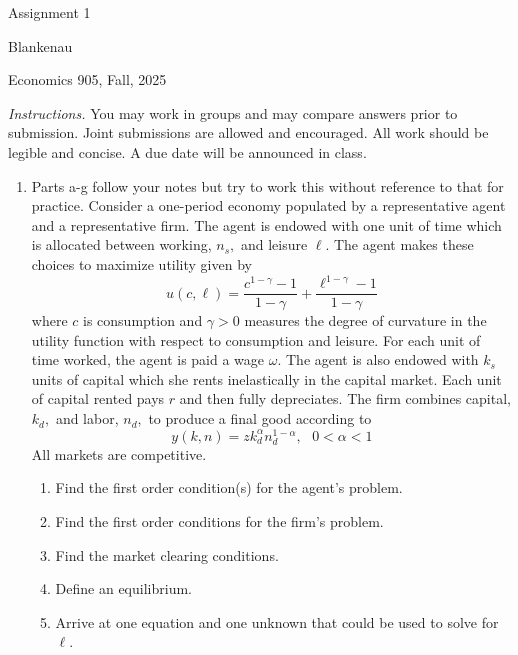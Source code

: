 \documentclass[12pt]{article}
\begin{document}
\begin{center}
{\LARGE Assignment 1}
\end{center}

\noindent Blankenau

\noindent Economics 905, Fall, 2025

\medskip
\noindent \textit{Instructions.} You may work in groups and may compare
answers prior to submission. Joint submissions are allowed and encouraged.
All work should be legible and concise. A due date will be announced in
class.

\begin{enumerate}
\item Parts a-g follow your notes but try to work this without reference to
that for practice. Consider a one-period economy populated by a
representative agent and a representative firm. The agent is endowed with
one unit of time which is allocated between working, $n_{s},$ and leisure $%
\ell $. The agent makes these choices to maximize utility given by 
\begin{equation*}
u\left( c,\ell \right) =\frac{c^{1-\gamma }-1}{1-\gamma }+\frac{\ell
^{1-\gamma }-1}{1-\gamma }
\end{equation*}%
where $c$ is consumption and $\gamma >0$ measures the degree of curvature in
the utility function with respect to consumption and leisure. For each unit
of time worked, the agent is paid a wage $\omega $. The agent is also
endowed with $k_{s}$ units of capital which she rents inelastically in the
capital market. Each unit of capital rented pays $r$ and then fully
depreciates. The firm combines capital, $k_{d},$ and labor, $n_{d},$ to
produce a final good according to 
\begin{equation}
y\left( k,n\right) =zk_{d}^{\alpha }n_{d}^{1-\alpha },\text{ }0<\alpha <1
\label{out}
\end{equation}%
All markets are competitive.

\begin{enumerate}
\item Find the first order condition(s) for the agent's problem.

\item Find the first order conditions for the firm's problem.

\item Find the market clearing conditions.

\item Define an equilibrium.

\item Arrive at one equation and one unknown that could be used to solve for 
$\ell .$


\end{enumerate}
\end{enumerate}
\end{document}
